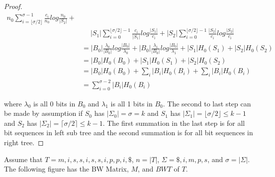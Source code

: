 \documentclass[11pt]{article}
\begin{document}
\begin{proof}
\begin{align*}
                                       n_0 \sum_{i=\lfloor \sigma/2 \rfloor}^{\sigma - 1} \frac{c_i}{n_0} log \frac{n_0}{|S_2|} + \\
                                    &\;\quad|S_1| \sum_{i=0}^{\lfloor \sigma/2 \rfloor - 1} \frac{c_i}{|S_1|} log \frac{|S_1|}{c_i} +
                                       |S_2| \sum_{i=0}^{\lfloor \sigma/2 \rfloor - 1} \frac{|S_2|}{c_i} log \frac{|S_2|}{c_i} \\
                                    &= |B_0| \frac{\lambda_0}{|B_0|} log \frac{|B_0|}{\lambda_0} +
                                       |B_0| \frac{\lambda_1}{|B_0|} log \frac{|B_0|}{\lambda_1} +
                                       |S_1| H_0(S_1) + |S_2| H_0(S_2) \\
                                    &= |B_0| H_0(B_0) + |S_1| H_0(S_1) + |S_2| H_0(S_2) \\
                                    &= |B_0| H_0(B_0) + \sum_{i} |B_i| H_0(B_i) + \sum_{i} |B_i| H_0(B_i) \\
                                    &=  \sum_{i=0}^{\sigma-2} |B_i| H_0(B_i)
\end{align*}

where $\lambda_0$ is all 0 bits in $B_0$ and $\lambda_1$ is all 1 bits in $B_0$. The second to last step can be made by assumption if $S_0$ has $|\Sigma_0| = \sigma = k$ and $S_1$ has $|\Sigma_1| = \lfloor \sigma/2 \rfloor \leq k-1$ and $S_2$ has $|\Sigma_2| = \lceil \sigma/2 \rceil \leq k-1$. The first summation in the last step is for all bit sequences in left sub tree and the second summation is for all bit sequences in right tree.

\end{proof}



\bigskip
{}

Assume that $T = { m, i, s, s, i, s, s, i, p, p, i, \$ }$, $n = |T|$, $\Sigma = { \$, i, m, p, s}$, and $\sigma = |\Sigma|$. The following figure has the BW Matrix, $M$, and $BWT$ of $T$.
\end{document}
